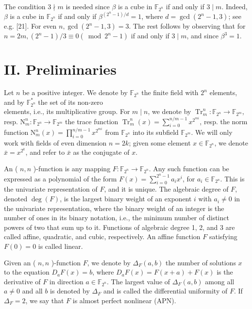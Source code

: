 \documentclass[10pt]{article}
\begin{document}
The condition $3 \nmid m$ is needed since $\beta$ is a cube in $\mathbb{F}_{2^{n}}$ if and only if $3 \mid m$. Indeed, $\beta$ is a cube in $\mathbb{F}_{2^{n}}$ if and only if $\beta^{\left(2^{n}-1\right) / d}=1$, where $d=\operatorname{gcd}\left(2^{n}-1,3\right)$; see e.g. [21]. For even $n, \operatorname{gcd}\left(2^{n}-1,3\right)=3$. The rest follows by observing that for $n=2 m,\left(2^{n}-1\right) / 3 \equiv 0\left(\bmod 2^{n}-1\right)$ if and only if $3 \mid m$, and since $\beta^{3}=1$.

\section*{II. Preliminaries}
Let $n$ be a positive integer. We denote by $\mathbb{F}_{2^{n}}$ the finite field with $2^{n}$ elements, and by $\mathbb{F}_{2^{n}}^{*}$ the set of its non-zero\\
elements, i.e., its multiplicative group. For $m \mid n$, we denote by $\operatorname{Tr}_{m}^{n}: \mathbb{F}_{2^{n}} \rightarrow \mathbb{F}_{2^{m}}$, resp. $\mathrm{N}_{m}^{n}: \mathbb{F}_{2^{n}} \rightarrow \mathbb{F}_{2^{m}}$ the trace function $\operatorname{Tr}_{m}^{n}(x)=\sum_{i=0}^{n / m-1} x^{2^{m i}}$, resp. the norm function $\mathrm{N}_{m}^{n}(x)=\prod_{i=0}^{n / m-1} x^{2^{m i}}$ from $\mathbb{F}_{2^{n}}$ into its subfield $\mathbb{F}_{2^{m}}$. We will only work with fields of even dimension $n=2 k$; given some element $x \in \mathbb{F}_{2^{n}}$, we denote $\bar{x}=x^{2^{k}}$, and refer to $\bar{x}$ as the conjugate of $x$.

An ( $n, n$ )-function is any mapping $F: \mathbb{F}_{2^{n}} \rightarrow \mathbb{F}_{2^{n}}$. Any such function can be expressed as a polynomial of the form $F(x)=\sum_{i=0}^{2^{n}-1} a_{i} x^{i}$, for $a_{i} \in \mathbb{F}_{2^{n}}$. This is the univariate representation of $F$, and it is unique. The algebraic degree of $F$, denoted $\operatorname{deg}(F)$, is the largest binary weight of an exponent $i$ with $a_{i} \neq 0$ in the univariate representation, where the binary weight of an integer is the number of ones in its binary notation, i.e., the minimum number of distinct powers of two that sum up to it. Functions of algebraic degree 1, 2, and 3 are called affine, quadratic, and cubic, respectively. An affine function $F$ satisfying $F(0)=0$ is called linear.

Given an ( $n, n$ )-function $F$, we denote by $\Delta_{F}(a, b)$ the number of solutions $x$ to the equation $D_{a} F(x)=b$, where $D_{a} F(x)=F(x+a)+F(x)$ is the derivative of $F$ in direction $a \in \mathbb{F}_{2^{n}}$. The largest value of $\Delta_{F}(a, b)$ among all $a \neq 0$ and all $b$ is denoted by $\Delta_{F}$ and is called the differential uniformity of $F$. If $\Delta_{F}=2$, we say that $F$ is almost perfect nonlinear (APN).
\end{document}
